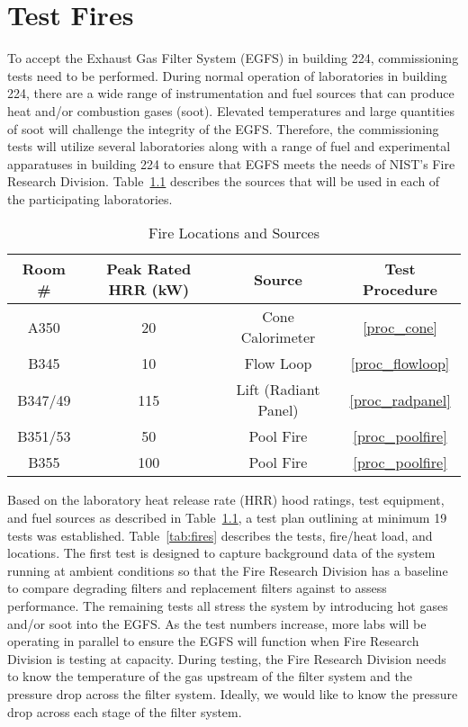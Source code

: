 \documentclass[12pt,oneside]{book}
\begin{document}
\chapter{Test Fires}
\label{test_fires}
To accept the Exhaust Gas Filter System (EGFS) in building 224, commissioning tests need to be performed.  During normal operation of laboratories in building 224, there are a wide range of instrumentation and fuel sources that can produce heat and/or combustion gases (soot). Elevated temperatures and large quantities of soot will challenge the integrity of the EGFS. Therefore, the commissioning tests will utilize several laboratories along with a range of fuel and experimental apparatuses in building 224 to ensure that EGFS meets the needs of NIST's Fire Research Division. Table~\ref{tab:sources} describes the sources that will be used in each of the participating laboratories.

\begin{table}[!h]
\centering
\caption{Fire Locations and Sources}
\label{tab:sources}
\begin{tabular}{cccc}
\toprule[1.5pt]
Room \# & Peak Rated HRR (kW) & Source & Test Procedure  \\
\midrule
A350     & 20   & Cone Calorimeter     & \ref{proc_cone}  \\
B345     & 10   & Flow Loop            & \ref{proc_flowloop}  \\
B347/49  & 115  & Lift (Radiant Panel) & \ref{proc_radpanel} \\
B351/53  & 50   & Pool Fire            & \ref{proc_poolfire} \\
B355     & 100  & Pool Fire            & \ref{proc_poolfire} \\
\bottomrule[1.25pt]
\end{tabular}\par
\end{table}

Based on the laboratory heat release rate (HRR) hood ratings, test equipment, and fuel sources as described in Table~\ref{tab:sources}, a test plan outlining at minimum 19 tests was established. Table~\ref{tab:fires} describes the tests, fire/heat load, and locations. The first test is designed to capture background data of the system running at ambient conditions so that the Fire Research Division has a baseline to compare degrading filters and replacement filters against to assess performance. The remaining tests all stress the system by introducing hot gases and/or soot into the EGFS. As the test numbers increase, more labs will be operating in parallel to ensure the EGFS will function when Fire Research Division is testing at capacity. During testing, the Fire Research Division needs to know the temperature of the gas upstream of the filter system and the pressure drop across the filter system. Ideally, we would like to know the pressure drop across each stage of the filter system.
\end{document}
